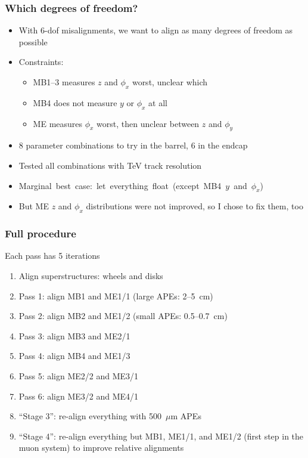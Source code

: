 \documentclass[compress]{beamer}
\begin{document}
\begin{frame}
\frametitle{Which degrees of freedom?}

\begin{itemize}\setlength{\itemsep}{0.25 cm}
\item With 6-dof misalignments, we want to align as many degrees of freedom as possible

\item Constraints:
\begin{itemize}
\item MB1--3 measures $z$ and $\phi_x$ worst, unclear which
\item MB4 does not measure $y$ or $\phi_x$ at all
\item ME measures $\phi_x$ worst, then unclear between $z$ and $\phi_y$
\end{itemize}

\item 8 parameter combinations to try in the barrel, 6 in the endcap

\item Tested all combinations with TeV track resolution

\item \mbox{Marginal best case: let everything float (except MB4 $y$ and $\phi_x$) \hspace{-1 cm}}

\item But ME $z$ and $\phi_x$ distributions were not improved, so I
chose to fix them, too
\end{itemize}

\end{frame}

\begin{frame}
\frametitle{Full procedure}

Each pass has 5 iterations

\begin{enumerate}
\item Align superstructures: wheels and disks
\item Pass 1: align MB1 and ME1/1 (large APEs: 2--5~cm)
\item Pass 2: align MB2 and ME1/2 (small APEs: 0.5--0.7~cm)
\item Pass 3: align MB3 and ME2/1
\item Pass 4: align MB4 and ME1/3
\item Pass 5: align ME2/2 and ME3/1
\item Pass 6: align ME3/2 and ME4/1
\item ``Stage 3'': re-align everything with 500~$\mu$m APEs
\item ``Stage 4'': re-align everything but MB1, ME1/1, and ME1/2 (first step in the muon system) to improve relative alignments
\end{enumerate}
\end{frame}
\end{document}
